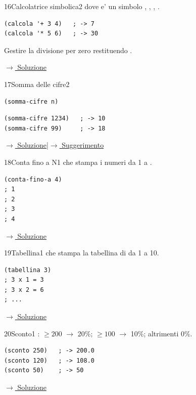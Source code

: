 \label{ex:16}
\begin{stdbox}{16}{Calcolatrice simbolica}{2}
  dove  e' un simbolo
, , , .
\begin{lstlisting}
(calcola '+ 3 4)   ; -> 7
(calcola '* 5 6)   ; -> 30
\end{lstlisting}
Gestire la divisione per zero restituendo .


\small\color{black!55}\hyperref[sol:16]{$\rightarrow$ Soluzione}\normalsize\color{black}
\end{stdbox}

\label{ex:17}
\begin{essbox}{17}{Somma delle cifre}{2}
\nopagebreak
\begin{lstlisting}
(somma-cifre n)
\end{lstlisting}
\begin{lstlisting}
(somma-cifre 1234)   ; -> 10
(somma-cifre 99)     ; -> 18
\end{lstlisting}


\small\color{black!55}\hyperref[sol:17]{$\rightarrow$ Soluzione}\enspace\textcolor{black!30}{|}\enspace\hyperref[hint:17]{$\rightarrow$ Suggerimento}\normalsize\color{black}
\end{essbox}

\label{ex:18}
\begin{essbox}{18}{Conta fino a N}{1}
  che stampa i numeri da 1 a .
\nopagebreak
\begin{lstlisting}
(conta-fino-a 4)
; 1
; 2
; 3
; 4
\end{lstlisting}


\small\color{black!55}\hyperref[sol:18]{$\rightarrow$ Soluzione}\normalsize\color{black}
\end{essbox}

\label{ex:19}
\begin{colbox}{19}{Tabellina}{1}
  che stampa la tabellina di 
da 1 a 10.
\begin{lstlisting}
(tabellina 3)
; 3 x 1 = 3
; 3 x 2 = 6
; ...
\end{lstlisting}


\small\color{black!55}\hyperref[sol:19]{$\rightarrow$ Soluzione}\normalsize\color{black}
\end{colbox}

\label{ex:20}
\begin{colbox}{20}{Sconto}{1}
 :
$\geq 200$ $\to$ 20\%; $\geq 100$ $\to$ 10\%; altrimenti 0\%.
\begin{lstlisting}
(sconto 250)   ; -> 200.0
(sconto 120)   ; -> 108.0
(sconto 50)    ; -> 50
\end{lstlisting}


\small\color{black!55}\hyperref[sol:20]{$\rightarrow$ Soluzione}\normalsize\color{black}
\end{colbox}

